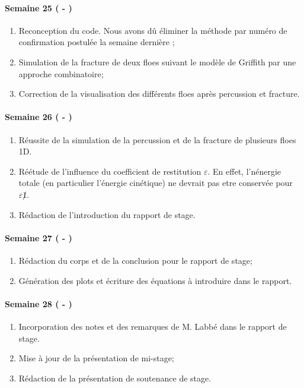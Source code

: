 \paragraph{Semaine 25 ( - )} 
\begin{enumerate}
    \item Reconception du code. Nous avons dû éliminer la méthode par numéro de confirmation postulée la semaine dernière ;
    \item Simulation de la fracture de deux floes suivant le modèle de Griffith par une approche combinatoire;
    \item Correction de la visualisation des différents floes après percussion et fracture.
\end{enumerate}
  
\paragraph{Semaine 26 ( - )} 
\begin{enumerate}
    \item Réussite de la simulation de la percussion et de la fracture de plusieurs floes 1D.
    \item Réétude de l'influence du coefficient de restitution $\varepsilon$. En effet, l'nénergie totale (en particulier l'énergie cinétique) ne devrait pas etre conservée pour $\varepsilon \not 1$.
    \item Rédaction de l'introduction du rapport de stage.
\end{enumerate}
  
\paragraph{Semaine 27 ( - )} 
\begin{enumerate}
    \item Rédaction du corps et de la conclusion pour le rapport de stage;
    \item Génération des plots et écriture des équations à introduire dans le rapport. 
\end{enumerate}

\paragraph{Semaine 28 ( - )} 
\begin{enumerate}
    \item Incorporation des notes et des remarques de M. Labbé dans le rapport de stage.
    \item Mise à jour de la présentation de mi-stage;
    \item Rédaction de la présentation de soutenance de stage.
\end{enumerate}

